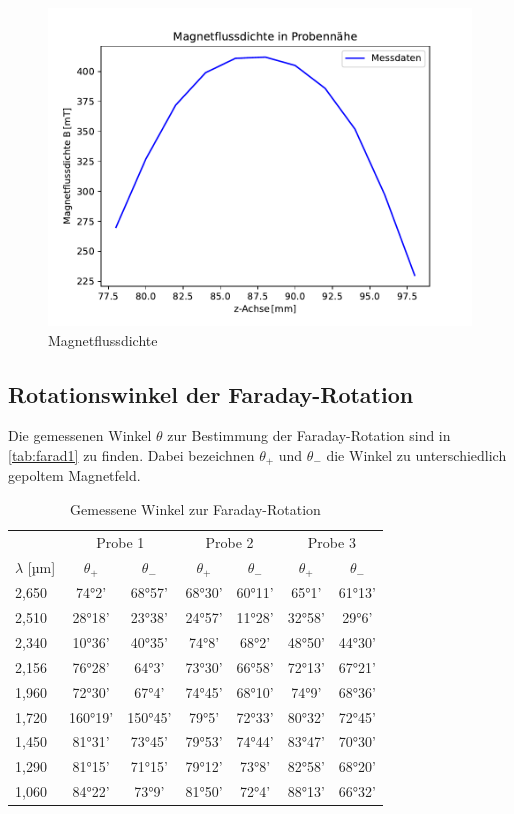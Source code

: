\begin{figure}
\includegraphics{content/grafiken/BFeld.pdf}
\caption{Magnetflussdichte}
\label{fig:magn}
\end{figure}




\subsection{Rotationswinkel der Faraday-Rotation}

Die gemessenen Winkel $\theta$ zur Bestimmung der Faraday-Rotation sind in \autoref{tab:farad1} zu finden.
Dabei bezeichnen $\theta_+$ und $\theta_-$ die Winkel zu unterschiedlich gepoltem Magnetfeld.


\begin{table}
\centering
\caption{Gemessene Winkel zur Faraday-Rotation}
\begin{tabular}{|l|c c|c c|c c|}
\hline
&\multicolumn{2}{c|}{Probe 1}&\multicolumn{2}{c|}{Probe 2}&\multicolumn{2}{c|}{Probe 3}\\
$\lambda$ [µm]&$\theta_+$&$\theta_-$&$\theta_+$&$\theta_-$&$\theta_+$&$\theta_-$\\
\hline
2,650&74°2'&68°57'&68°30'&60°11'&65°1'&61°13'\\
2,510&28°18'&23°38'&24°57'&11°28'&32°58'&29°6'\\
2,340&10°36'&40°35'&74°8'&68°2'&48°50'&44°30'\\
2,156&76°28'&64°3'&73°30'&66°58'&72°13'&67°21'\\
1,960&72°30'&67°4'&74°45'&68°10'&74°9'&68°36'\\
1,720&160°19'&150°45'&79°5'&72°33'&80°32'&72°45'\\
1,450&81°31'&73°45'&79°53'&74°44'&83°47'&70°30'\\
1,290&81°15'&71°15'&79°12'&73°8'&82°58'&68°20'\\
1,060&84°22'&73°9'&81°50'&72°4'&88°13'&66°32'\\
\hline
\end{tabular}\label{tab:farad1}
\end{table}

